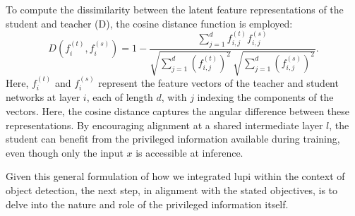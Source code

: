 To compute the dissimilarity between the latent feature representations of the student and teacher (\gls{D}), the cosine distance function is employed:
\begin{equation} \label{eq:cosine_distance}
D(f_i^{(t)}, f_i^{(s)}) = 1 - \frac{\sum_{j=1}^{d} f_{i,j}^{(t)} f_{i,j}^{(s)}}{\sqrt{\sum_{j=1}^{d} (f_{i,j}^{(t)})^2} \, \sqrt{\sum_{j=1}^{d} (f_{i,j}^{(s)})^2}}.
\end{equation}
Here, \( f_i^{(t)} \) and \( f_i^{(s)} \) represent the feature vectors of the teacher and student networks at layer \( i \), each of length \( d \), with \( j \) indexing the components of the vectors. Here, the cosine distance captures the angular difference between these representations. By encouraging alignment at a shared intermediate layer \( l \), the student can benefit from the privileged information available during training, even though only the input \( x \) is accessible at inference.

Given this general formulation of how we integrated \gls{lupi} within the context of object detection, the next step, in alignment with the stated objectives, is to delve into the nature and role of the privileged information itself.





